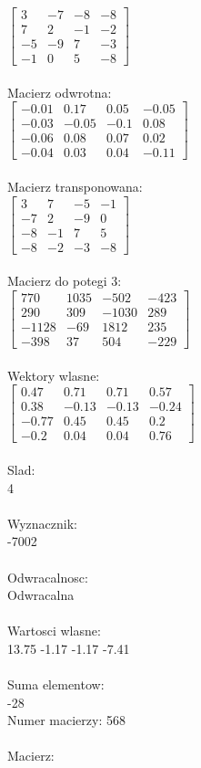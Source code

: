\documentclass[a4paper,12pt]{article}
\begin{document}
$\begin{bmatrix} 3&-7&-8&-8\\7&2&-1&-2\\-5&-9&7&-3\\-1&0&5&-8 \end{bmatrix}$
\\
\\
Macierz odwrotna:\\

$\begin{bmatrix} -0.01&0.17&0.05&-0.05\\-0.03&-0.05&-0.1&0.08\\-0.06&0.08&0.07&0.02\\-0.04&0.03&0.04&-0.11 \end{bmatrix}$
\\
\\
Macierz transponowana:\\

$\begin{bmatrix} 3&7&-5&-1\\-7&2&-9&0\\-8&-1&7&5\\-8&-2&-3&-8 \end{bmatrix}$
\\
\\
Macierz do potegi 3:\\

$\begin{bmatrix} 770&1035&-502&-423\\290&309&-1030&289\\-1128&-69&1812&235\\-398&37&504&-229 \end{bmatrix}$
\\
\\
Wektory wlasne:\\

$\begin{bmatrix} 0.47&0.71&0.71&0.57\\0.38&-0.13&-0.13&-0.24\\-0.77&0.45&0.45&0.2\\-0.2&0.04&0.04&0.76 \end{bmatrix}$
\\
\\
Slad:\\
4
\\
\\
Wyznacznik:\\
-7002
\\
\\
Odwracalnosc:\\
Odwracalna
\\
\\
Wartosci wlasne:\\
13.75 -1.17 -1.17 -7.41
\\
\\
Suma elementow:\\
-28
\\
\newpage
Numer macierzy:
568
\\
\\
Macierz:\\
\end{document}
